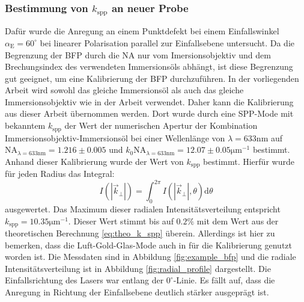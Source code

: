 \documentclass[titlepage]{article}
\begin{document}
	\subsubsection{Bestimmung von  $k_{\mathrm{spp}}$ an neuer Probe}
	Dafür wurde die Anregung an einem Punktdefekt bei einem Einfallswinkel $\alpha_{\mathrm{E}} = 60^\circ$ bei linearer Polarisation parallel zur Einfallsebene untersucht. Da die Begrenzung der BFP durch die NA nur vom Imersionsobjektiv und dem Brechungsindex des verwendeten Immersionsöls abhängt, ist diese Begrenzung gut geeignet, um eine Kalibrierung der BFP durchzuführen. In der vorliegenden Arbeit wird sowohl das gleiche Immersionsöl als auch das gleiche Immersionsobjektiv wie in der Arbeit\cite{Jaruschewski.2020} verwendet. Daher kann die Kalibrierung aus dieser Arbeit übernommen werden. Dort wurde durch eine SPP-Mode mit bekanntem $k_{\mathrm{spp}}$ der Wert der numerischen Apertur der Kombination Immersionsobjektiv-Immersionsöl bei einer Wellenlänge von $\lambda=633\mathrm{nm}$ auf $\mathrm{NA}_{\lambda = 633 \mathrm{nm}} = 1.216 \pm 0.005$  und $k_0\mathrm{NA}_{\lambda = 633 \mathrm{nm}} = 12.07 \pm 0.05\mathrm{\mu m}^{-1}$ bestimmt. Anhand dieser Kalibrierung wurde der Wert von $k_{\mathrm{spp}}$ bestimmt. Hierfür wurde für jeden Radius das Integral:
	$$ I\left(|\vec{k}_{\bot}|\right) = \int_{0}^{2 \pi} I\left(|\vec{k}_{\bot}|, \theta\right)\mathrm{d}\theta$$
	ausgewertet. Das Maximum dieser radialen Intensitätsverteilung entspricht $k_{\mathrm{spp}} = 10.35\mathrm{\mu m}^{-1}$.
	Dieser Wert stimmt bis auf $0.2\%$ mit dem Wert aus der theoretischen Berechnung \eqref{eq:theo_k_spp} überein. Allerdings ist hier zu bemerken, dass die Luft-Gold-Glas-Mode auch in \cite{Jaruschewski.2020} für die Kalibrierung genutzt worden ist. Die Messdaten sind in Abbildung \ref{fig:example_bfp} und die radiale Intensitätsverteilung ist in Abbildung \ref{fig:radial_profile} dargestellt. Die Einfallsrichtung des Lasers war entlang der $0^\circ$-Linie. Es fällt auf, dass die Anregung in Richtung der Einfallsebene deutlich stärker ausgeprägt ist. 
\end{document}
